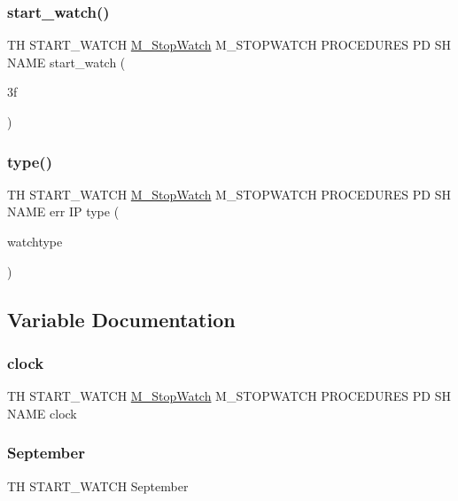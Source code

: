\subsubsection{\texorpdfstring{start\+\_\+watch()}{start\_watch()}}
{\footnotesize\ttfamily TH S\+T\+A\+R\+T\+\_\+\+W\+A\+T\+CH \hyperlink{option__stopwatch_83_8txt_aa2011fc45a5e502e87ee50996a8a9305}{M\+\_\+\+Stop\+Watch} M\+\_\+\+S\+T\+O\+P\+W\+A\+T\+CH P\+R\+O\+C\+E\+D\+U\+R\+ES PD SH N\+A\+ME start\+\_\+watch (\begin{DoxyParamCaption}\item[{3f}]{ }\end{DoxyParamCaption})}

\mbox{\label{start__watch_83_8txt_afb126b5ee09c3784b94acaa05b3b2d5f}} 
\subsubsection{\texorpdfstring{type()}{type()}}
{\footnotesize\ttfamily TH S\+T\+A\+R\+T\+\_\+\+W\+A\+T\+CH \hyperlink{option__stopwatch_83_8txt_aa2011fc45a5e502e87ee50996a8a9305}{M\+\_\+\+Stop\+Watch} M\+\_\+\+S\+T\+O\+P\+W\+A\+T\+CH P\+R\+O\+C\+E\+D\+U\+R\+ES PD SH N\+A\+ME err IP type (\begin{DoxyParamCaption}\item[{watchtype}]{ }\end{DoxyParamCaption})}



\subsection{Variable Documentation}
\mbox{\label{start__watch_83_8txt_aeadc6e1a3f40066d313c6190ab99a7fe}} 
\subsubsection{\texorpdfstring{clock}{clock}}
{\footnotesize\ttfamily TH S\+T\+A\+R\+T\+\_\+\+W\+A\+T\+CH \hyperlink{option__stopwatch_83_8txt_aa2011fc45a5e502e87ee50996a8a9305}{M\+\_\+\+Stop\+Watch} M\+\_\+\+S\+T\+O\+P\+W\+A\+T\+CH P\+R\+O\+C\+E\+D\+U\+R\+ES PD SH N\+A\+ME clock}

\mbox{\label{start__watch_83_8txt_aa28beaa3f308bdbe703fa8484f87082d}} 
\subsubsection{\texorpdfstring{September}{September}}
{\footnotesize\ttfamily TH S\+T\+A\+R\+T\+\_\+\+W\+A\+T\+CH September}

